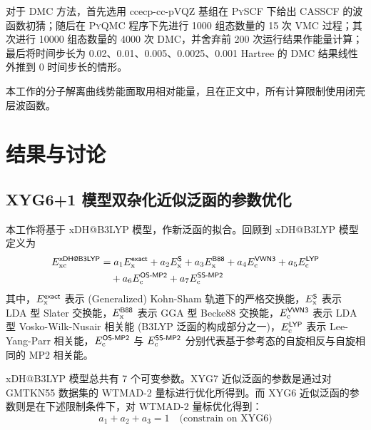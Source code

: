 对于 DMC 方法，首先选用 ccecp-cc-pVQZ 基组在 \textsc{PySCF} 下给出 CASSCF 的波函数初猜；随后在 \textsc{PyQMC} 程序下先进行 1000 组态数量的 15 次 VMC 过程；其次进行 10000 组态数量的 4000 次 DMC，并舍弃前 200 次运行结果作能量计算；最后将时间步长为 0.02、0.01、0.005、0.0025、0.001 Hartree 的 DMC 结果线性外推到 0 时间步长的情形。

本工作的分子解离曲线势能面取用相对能量，且在正文中，所有计算限制使用闭壳层波函数。

\section{结果与讨论}
\label{sec.2.iepa-results}

\subsection{XYG6+1 模型双杂化近似泛函的参数优化}

本工作将基于 xDH@B3LYP 模型\cite{Zhang-Xu.JPCL.2021}，作新泛函的拟合。回顾到 xDH@B3LYP 模型定义为
\begin{align}
  E_\mathrm{xc}^{\textsf{xDH@B3LYP}} &= a_1 E_\mathrm{x}^{\textsf{exact}} + a_2 E_\mathrm{x}^{\textsf{S}} + a_3 E_\mathrm{x}^{\textsf{B88}} + a_4 E_\mathrm{c}^{\textsf{VWN3}} + a_5 E_\mathrm{c}^{\textsf{LYP}} \notag \\
  &\quad + a_6 E_\mathrm{c}^{\textsf{OS-MP2}} + a_7 E_\mathrm{c}^{\textsf{SS-MP2}}
\end{align}
其中，$E_\mathrm{x}^{\textsf{exact}}$ 表示 (Generalized) Kohn-Sham 轨道下的严格交换能，$E_\mathrm{x}^{\textsf{S}}$ 表示 LDA 型 Slater 交换能\cite{Bloch-Bloch.ZP.1929,Dirac-Dirac.MPCPS.1930}，$E_\mathrm{x}^{\textsf{B88}}$ 表示 GGA 型 Becke88 交换能\cite{Becke-Becke.PRA.1988}，$E_\mathrm{c}^{\textsf{VWN3}}$ 表示 LDA 型 Vosko-Wilk-Nusair 相关能\cite{Vosko-Nusair.CJP.1980} (B3LYP 泛函的构成部分之一\cite{Becke-Becke.JCP.1993,Stephens-Frisch.JPC.1994})，$E_\mathrm{c}^{\textsf{LYP}}$ 表示 Lee-Yang-Parr 相关能\cite{Lee-Parr.PRB.1988}，$E_\mathrm{c}^{\textsf{OS-MP2}}$ 与 $E_\mathrm{c}^{\textsf{SS-MP2}}$ 分别代表基于参考态的自旋相反与自旋相同的 MP2 相关能。

xDH@B3LYP 模型总共有 7 个可变参数。XYG7 近似泛函的参数是通过对 GMTKN55 数据集的 WTMAD-2 量标进行优化所得到。而 XYG6 近似泛函的参数则是在下述限制条件下，对 WTMAD-2 量标优化得到：
\begin{equation}
  \label{eq.2.constrain-xyg6}
  a_1 + a_2 + a_3 = 1 \quad \text{(constrain on XYG6)}
\end{equation}

